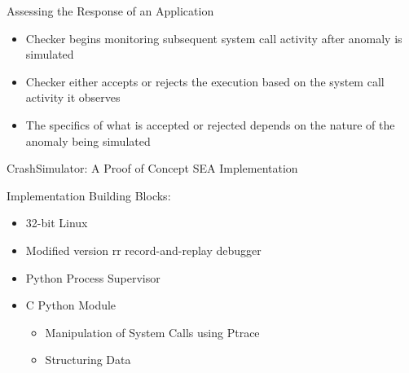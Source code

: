 \documentclass[pdf]{beamer}
\begin{document}
%
%


\begin{frame}{Assessing the Response of an Application}
  \begin{itemize}
  \item{Checker begins monitoring subsequent system call activity
    after anomaly is simulated}
  \item{Checker either accepts or rejects the execution based on the system
    call activity it observes}
  \item{The specifics of what is accepted or rejected depends on the nature
    of the anomaly being simulated}
  \end{itemize}
\end{frame}


\begin{frame}{CrashSimulator: A Proof of Concept SEA Implementation}

  Implementation Building Blocks:

  \begin{itemize}
  \item{32-bit Linux}
  \item{Modified version rr record-and-replay debugger}
  \item{Python Process Supervisor}
  \item{C Python Module}
    \begin{itemize}
    \item{Manipulation of System Calls using Ptrace}
    \item{Structuring Data}
    \end{itemize}
  \end{itemize}
\end{frame}
\end{document}
